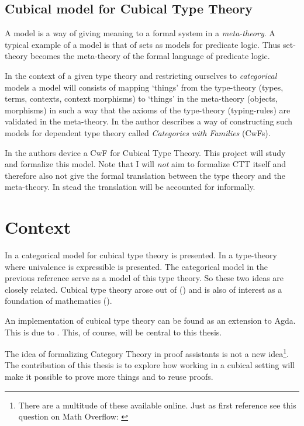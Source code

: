 \documentclass{article}
\begin{document}
\subsection{Cubical model for Cubical Type Theory}
%
A model is a way of giving meaning to a formal system in a \emph{meta-theory}. A
typical example of a model is that of sets as models for predicate logic. Thus
set-theory becomes the meta-theory of the formal language of predicate logic.

In the context of a given type theory and restricting ourselves to
\emph{categorical} models a model will consists of mapping `things' from the
type-theory (types, terms, contexts, context morphisms) to `things' in the
meta-theory (objects, morphisms) in such a way that the axioms of the
type-theory (typing-rules) are validated in the meta-theory. In
\cite{dybjer-1995} the author describes a way of constructing such models for
dependent type theory called \emph{Categories with Families} (CwFs).

In \cite{bezem-2014} the authors device a CwF for Cubical Type Theory. This
project will study and formalize this model. Note that I will \emph{not} aim to
formalize CTT itself and therefore also not give the formal translation between
the type theory and the meta-theory. In stead the translation will be accounted
for informally.
%
\section{Context}
%
In \cite{bezem-2014} a categorical model for cubical type theory is presented.
In \cite{cohen-2016} a type-theory where univalence is expressible is presented.
The categorical model in the previous reference serve as a model of this type
theory. So these two ideas are closely related. Cubical type theory arose out of
 (\cite{hott-2013}) and is also of interest as a
foundation of mathematics (\cite{voevodsky-2011}).

An implementation of cubical type theory can be found as an extension to Agda.
This is due to \citeauthor{cubical-agda}. This, of course, will be central to
this thesis.

The idea of formalizing Category Theory in proof assistants is not a new
idea\footnote{There are a multitude of these available online. Just as first
reference see this question on Math Overflow: \cite{mo-formalizations}}. The
contribution of this thesis is to explore how working in a cubical setting will
make it possible to prove more things and to reuse proofs.
\end{document}

